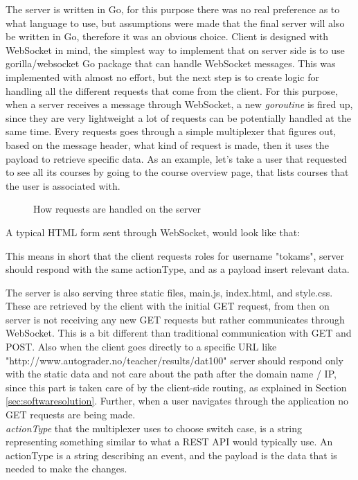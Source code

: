 The server is written in Go, for this purpose there was no real  preference as to what language to use, but assumptions were made that the final server will also be written in Go, therefore it was an obvious choice. Client is designed with WebSocket in mind, the simplest way to implement that on server side is to use gorilla/websocket Go package that can handle WebSocket messages. This was implemented with almost no effort, but the next step is to create logic for handling all the different requests that come from the client. For this purpose, when a server receives a message through WebSocket, a new \emph{goroutine} is fired up, since they are very lightweight a lot of requests can be potentially handled at the same time. Every requests goes through a simple multiplexer that figures out, based on the message header, what kind of request is made, then it uses the payload to retrieve specific data. As an example, let's take a user that requested to see all its courses by going to the course overview page, that lists courses that the user is associated with.

\begin{figure}[h]
  
  \caption{How requests are handled on the server}
  \label{fig:serverwebsocket}
\end{figure}

A typical HTML form sent through WebSocket, would look like that:

This means in short that the client requests roles for username "tokams", server should respond with the same actionType, and as a payload insert relevant data.

The server is also serving three static files, main.js, index.html, and style.css. These are retrieved by the client with the initial GET request, from then on server is not receiving any new GET requests but rather communicates through WebSocket. This is a bit different than traditional communication with GET and POST. Also when the client goes directly to a specific URL like "http://www.autograder.no/teacher/results/dat100" server should respond only with the static data and not care about the path after the domain name / IP, since this part is taken care of by the client-side routing, as explained in Section \ref{sec:softwaresolution}. Further, when a user navigates through the application no GET requests are being made.
\\\emph{actionType} that the multiplexer uses to choose switch case, is a string representing something similar to what a REST API would typically use. An actionType is a string describing an event, and the payload is the data that is needed to make the changes.
\newpage
